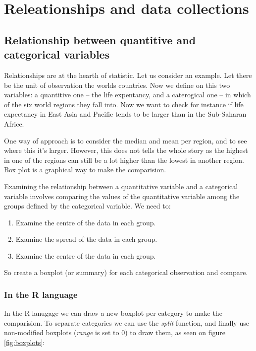 \section{Releationships and data collections}

\subsection{Relationship between quantitive and categorical variables}

Relationships are at the hearth of statistic. Let us consider an example. Let
there be the unit of observation the worlds countries. Now we define on this two
variables: a quantitive one -- the life expentancy, and a caterogical one -- in
which of the six world regions they fall into. Now we want to check for instance
if life expectancy in East Asia and Pacific tends to be larger than in the
Sub-Saharan Africe. 

One way of approach is to consider the median and mean per region, and to see
where this it's larger. However, this does not tells the whole story as the
highest in one of the regions can still be a lot higher than the lowest in
another region. Box plot is a graphical way to make the comparision.

Examining the relationship between a quantitative variable and a categorical
variable involves comparing the values of the quantitative variable among the
groups defined by the categorical variable. We need to:

\begin{enumerate}
  \item Examine the centre of the data in each group.
  \item Examine the spread of the data in each group.
  \item Examine the centre of the data in each group. 
\end{enumerate}

So create a boxplot (or summary) for each categorical observation and compare.

\subsubsection{In the R language}

In the R lanugage we can draw a new boxplot per category to make the
comparision. To separate categories we can use the \emph{split} function, and
finally use non-modified boxplots (\emph{range} is set to $0$) to draw them,
as seen on figure \ref{fig:boxplots}: 

